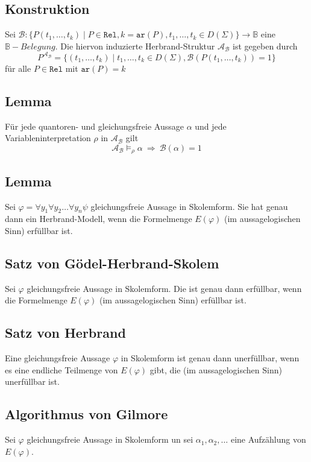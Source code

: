 \documentclass[12pt,a4paper]{report}
\newcommand{\ra}{\rightarrow}
\newcommand{\RA}{\Rightarrow}
\newcommand{\red}[1]{\textcolor[rgb]{0.9,0.2,0.2}{#1}}
\newcommand{\green}[1]{\textcolor[rgb]{0.1,0.6,0.1}{#1}}
\begin{document}
\subsection{\red{Konstruktion}}
Sei $ \mathcal{B}: \{P(t_1,\dots,t_k) \mid P \in \texttt{Rel}, k = \texttt{ar}(P), t_1,\dots,t_k \in D(\Sigma)\} \ra \mathbb{B} $ eine $ \mathbb{B}-Belegung $.
Die hiervon \red{induzierte Herbrand-Struktur $ \mathcal{A}_\mathcal{B} $} ist gegeben durch
\[
    P^{\mathcal{A}_\mathcal{B}} = \{ (t_1,\dots,t_k) \mid t_1,\dots,t_k \in D(\Sigma), \mathcal{B}(P(t_1,\dots,t_k)) = 1 \}
\]
für alle $ P \in \texttt{Rel} $ mit $ \texttt{ar}(P) =k$
\subsection{\green{Lemma}}
Für jede quantoren- und gleichungsfreie Aussage $ \alpha $ und jede Variableninterpretation $ \rho $ in $ \mathcal{A}_\mathcal{B} $ gilt
\[
    \mathcal{A}_\mathcal{B} \vDash_\rho \alpha ~\RA~ \mathcal{B}(\alpha) = 1
\]
\subsection{\green{Lemma}}
Sei $ \varphi = \forall y_1 \forall y_2 \dots \forall y_n \psi $ gleichungsfreie Aussage in Skolemform. Sie hat genau dann ein Herbrand-Modell, wenn die Formelmenge $ E(\varphi) $ (im aussagelogischen Sinn) erfüllbar ist.

\subsection{\green{Satz von Gödel-Herbrand-Skolem}}
Sei $ \varphi $ gleichungsfreie Aussage in Skolemform. Die ist genau dann erfüllbar, wenn die Formelmenge $ E(\varphi) $ (im aussagelogischen Sinn) erfüllbar ist.

\subsection{\green{Satz von Herbrand}}
Eine gleichungsfreie Aussage $ \varphi $ in Skolemform ist genau dann unerfüllbar, wenn es eine endliche Teilmenge von $ E(\varphi) $ gibt, die (im aussagelogischen Sinn) unerfüllbar ist.

\subsection{\red{Algorithmus von Gilmore}}
Sei $ \varphi $ gleichungsfreie Aussage in Skolemform un sei $ \alpha_1,\alpha_2,\dots $ eine Aufzählung von $ E(\varphi) $.
\end{document}
